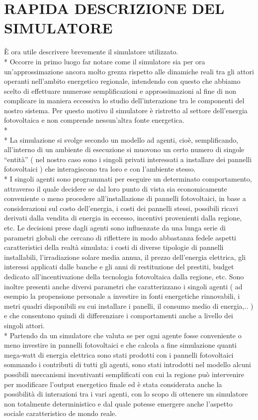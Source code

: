\documentclass[12pt,a4paper,openright,twoside]{report}
\begin{document}
\section[DESCRIZIONE SIMULATORE]{RAPIDA DESCRIZIONE DEL SIMULATORE}
È ora utile descrivere brevemente il simulatore utilizzato.\\*
Occorre in primo luogo far notare come il simulatore sia per ora un'approssimazione ancora molto grezza rispetto alle dinamiche reali tra gli attori operanti nell'ambito energetico regionale, intendendo con questo che abbiamo scelto di effettuare numerose semplificazioni e approssimazioni al fine di non complicare in maniera eccessiva lo studio dell'interazione tra le componenti del nostro sistema. Per questo motivo il simulatore è ristretto al settore dell'energia  fotovoltaica e non comprende nessun'altra fonte energetica.
\\* \\*
La simulazione si svolge secondo un modello ad agenti, cioè, semplificando, all'interno di un ambiente di esecuzione si muovono un certo numero di singole “entità” ( nel nostro caso sono i singoli privati interessati a installare dei pannelli fotovoltaici ) che interagiscono tra loro e con l'ambiente stesso. \\*
I singoli agenti sono programmati per eseguire un determinato comportamento, attraverso il quale decidere se dal loro punto di vista sia economicamente conveniente o meno  procedere all'installazione di pannelli fotovoltaici, in base a considerazioni sul costo dell'energia, i costi dei pannelli stessi, possibili ricavi derivati dalla vendita di energia in eccesso, incentivi provenienti dalla regione, etc. Le decisioni prese dagli agenti sono influenzate da una lunga serie di parametri globali che cercano di riflettere in modo abbastanza fedele aspetti caratteristici della realtà simulata: i costi di diverse tipologie di pannelli installabili,  l'irradiazione solare media annua, il prezzo dell'energia elettrica, gli interessi applicati dalle banche e gli anni di restituzione del prestiti, budget dedicato all'incentivazione della tecnologia fotovoltaica dalla regione, etc. Sono inoltre presenti anche diversi parametri che caratterizzano i singoli agenti ( ad esempio la propensione personale a investire in fonti energetiche rinnovabili, i metri quadri disponibili su cui installare i panelli, il consumo medio di energia,.. ) e che consentono quindi di differenziare i comportamenti anche a livello dei singoli attori.\\*
Partendo da un simulatore che valuta se per ogni agente fosse conveniente o meno investire in pannelli fotovoltaici e che calcola a fine simulazione quanti mega-watt di energia elettrica sono stati prodotti con i pannelli fotovoltaici sommando i contributi di tutti gli agenti, sono stati introdotti nel modello alcuni possibili meccanismi incentivanti semplificati con cui la regione può intervenire per modificare l'output energetico finale ed è stata considerata anche la possibilità di interazioni tra i vari agenti, con lo scopo di ottenere un simulatore non totalmente deterministico e dal quale potesse emergere anche l'aspetto sociale caratteristico de mondo reale. 
\end{document}
